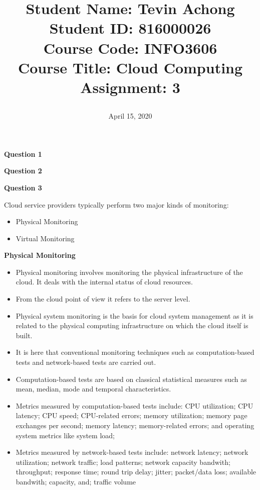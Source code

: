 \documentclass[a4paper, 12pt]{article}
\begin{document}
\title{
		\textbf{Student Name:} Tevin Achong\\
		\textbf{Student ID:} 816000026\\
		\textbf{Course Code:} INFO3606\\
		\textbf{Course Title:} Cloud Computing\\
		\textbf{Assignment:} 3
		\date{April 15, 2020}
}
\maketitle

\newpage
{}

\begin{center}
	\textbf{Question 1}
\end{center}



\newpage
\begin{center}
	\textbf{Question 2}
\end{center}

\newpage
\begin{center}
	\textbf{Question 3}
\end{center}

Cloud service providers typically perform two major kinds of monitoring:
\begin{itemize}
\item
Physical Monitoring
\item
Virtual Monitoring
\end{itemize}

\textbf{Physical Monitoring}
\begin{itemize}
\item
Physical monitoring involves monitoring the physical infrastructure of the cloud. It deals with the internal status of cloud resources. 
\item
From the cloud point of view it refers to the server level. 
\item
Physical system monitoring is the basis for cloud system management as it is related to the physical computing infrastructure on which the cloud itself is built.
\item
It is here that conventional monitoring techniques such as computation-based tests and network-based tests are carried out.
\item
Computation-based tests are based on classical statistical measures such as mean, median, mode and temporal characteristics.
\item
Metrics measured by computation-based tests include: CPU utilization; CPU latency; CPU speed; CPU-related errors; memory utilization; memory page exchanges per second; memory latency; memory-related errors; and operating system metrics like system load;
\item
Metrics measured by network-based tests include: network latency; network utilization; network traffic; load patterns; network capacity bandwith; throughput; response time; round trip delay; jitter; packet/data loss; available bandwith; capacity, and; traffic volume
\end{itemize}
\end{document}
